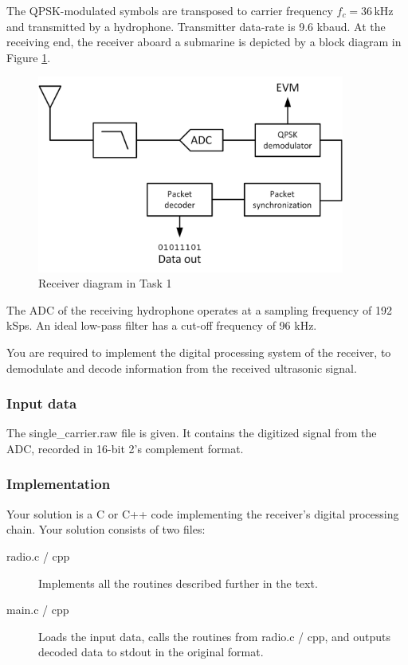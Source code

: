 \documentclass{article}
\begin{document}
The QPSK-modulated symbols are transposed to carrier frequency $f_c = 36 \,\textrm{kHz}$ and transmitted by a hydrophone. Transmitter data-rate is 9.6 kbaud. At the receiving end, the receiver aboard a submarine is depicted by a block diagram in Figure \ref{fig:task1}.

\begin{figure}[h!]
\centering
\includegraphics[width=0.9\textwidth]{Images/Task1.png}
\caption{Receiver diagram in Task 1}
\label{fig:task1}
\end{figure}

The ADC of the receiving hydrophone operates at a sampling frequency of 192 kSps. An ideal low-pass filter has a cut-off frequency of 96 kHz.

You are required to implement the digital processing system of the receiver, to demodulate and decode information from the received ultrasonic signal.

\subsubsection{Input data}
The \textsf{single\_carrier.raw} file is given. It contains the digitized signal from the ADC, recorded in 16-bit 2's complement format.

\subsubsection{Implementation}
Your solution is a C or C++ code implementing the receiver's digital processing chain. Your solution consists of two files:
\begin{description}
	\item[radio.c / cpp] Implements all the routines described further in the text.
	\item[main.c / cpp] Loads the input data, calls the routines from \textsf{radio.c / cpp}, and outputs decoded data to stdout in the original format.
\end{description}
\end{document}
